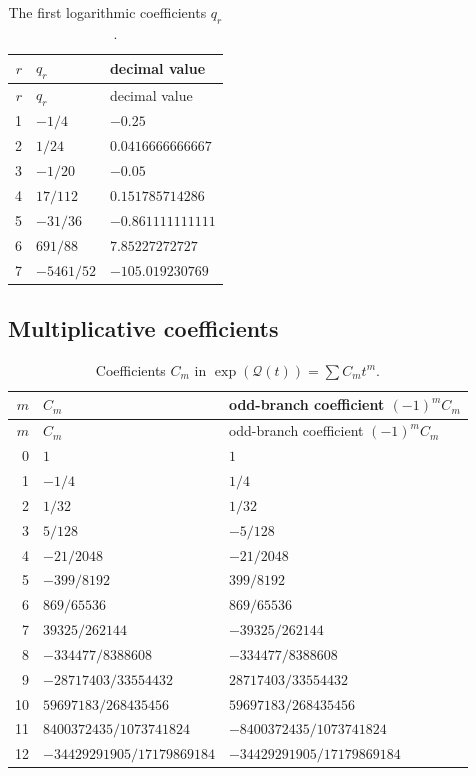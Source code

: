 \documentclass[11pt]{article}
\theoremstyle{definition}
\theoremstyle{remark}
\newcommand{\Qf}{\mathcal Q}
\begin{document}
\begin{longtable}{@{}rll@{}}
\caption{The first logarithmic coefficients $q_r$.}\label{tab:qcoeffs}\\
\toprule
$r$ & $q_r$ & decimal value\\
\midrule
\endfirsthead
\toprule
$r$ & $q_r$ & decimal value\\
\midrule
\endhead
1 & $-1/4$ & $-0.25$\\
2 & $1/24$ & $0.0416666666667$\\
3 & $-1/20$ & $-0.05$\\
4 & $17/112$ & $0.151785714286$\\
5 & $-31/36$ & $-0.861111111111$\\
6 & $691/88$ & $7.85227272727$\\
7 & $-5461/52$ & $-105.019230769$\\
\bottomrule
\end{longtable}

\subsection{Multiplicative coefficients}

\begin{longtable}{@{}rll@{}}
\caption{Coefficients $C_m$ in $\exp(\Qf(t))=\sum C_mt^m$.}\label{tab:Ccoeffs}\\
\toprule
$m$ & $C_m$ & odd-branch coefficient $(-1)^mC_m$\\
\midrule
\endfirsthead
\toprule
$m$ & $C_m$ & odd-branch coefficient $(-1)^mC_m$\\
\midrule
\endhead
0  & $1$ & $1$\\
1  & $-1/4$ & $1/4$\\
2  & $1/32$ & $1/32$\\
3  & $5/128$ & $-5/128$\\
4  & $-21/2048$ & $-21/2048$\\
5  & $-399/8192$ & $399/8192$\\
6  & $869/65536$ & $869/65536$\\
7  & $39325/262144$ & $-39325/262144$\\
8  & $-334477/8388608$ & $-334477/8388608$\\
9  & $-28717403/33554432$ & $28717403/33554432$\\
10 & $59697183/268435456$ & $59697183/268435456$\\
11 & $8400372435/1073741824$ & $-8400372435/1073741824$\\
12 & $-34429291905/17179869184$ & $-34429291905/17179869184$\\
\bottomrule
\end{longtable}
\end{document}
